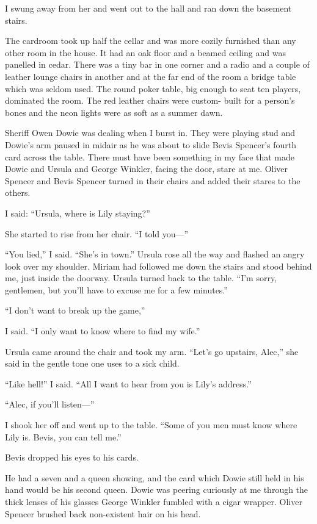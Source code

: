 \documentclass{novel}
\begin{document}
{I swung away from her and went out to the hall and ran down the basement stairs.

The cardroom took up half the cellar and was more cozily furnished than any other room in the house. It had an oak floor and a beamed ceiling and was panelled in cedar. There was a tiny bar in one corner and a radio and a couple of leather lounge chairs in another and at the far end of the room a bridge table which was seldom used. The round poker table, big enough to seat ten players, dominated the room. The red leather chairs were custom- built for a person’s bones and the neon lights were as soft as a summer dawn.

Sheriff Owen Dowie was dealing when I burst in. They were playing stud and Dowie’s arm paused in midair as he was about to slide Bevis Spencer’s fourth card across the table. There must have been something in my face that made Dowie and Ursula and George Winkler, facing the door, stare at me. Oliver Spencer and Bevis Spencer turned in their chairs and added their stares to the others.

I said: “Ursula, where is Lily staying?”

She started to rise from her chair. “I told you—”

“You lied,” I said. “She’s in town.” Ursula rose all the way and flashed an angry look over my shoulder. Miriam had followed me down the stairs and stood behind me, just inside the doorway. Ursula turned back to the table. “I’m sorry, gentlemen, but you’ll have to excuse me for a few minutes.”

“I don’t want to break up the game,”

I said. “I only want to know where to find my wife.”

Ursula came around the chair and took my arm. “Let’s go upstairs, Alec,” she said in the gentle tone one uses to a sick child.

“Like hell!” I said. “All I want to hear from you is Lily’s address.”

“Alec, if you’ll listen—”

I shook her off and went up to the table. “Some of you men must know where Lily is. Bevis, you can tell me.”

Bevis dropped his eyes to his cards.

He had a seven and a queen showing, and the card which Dowie still held in his hand would be his second queen. Dowie was peering curiously at me through the thick lenses of his glasses George Winkler fumbled with a cigar wrapper. Oliver Spencer brushed back non-existent hair on his head.

}
\end{document}
